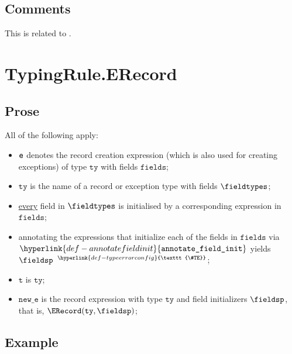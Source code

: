 \documentclass{book}
\newcommand\TypeErrorConfig[0]{\hyperlink{def-typeerrorconfig}{\texttt{\#TE}}}
\newcommand\ProseOrTypeError[0]{\hyperlink{def-proseortypeerror}{$^{\TypeErrorConfig}$}}
\newcommand\annotatefieldinit[0]{\hyperlink{def-annotatefieldinit}{\texttt{annotate\_field\_init}}}
\newcommand\vt[0]{\texttt{t}}
\newcommand\tty[0]{\texttt{ty}}
\newcommand\fields[0]{\texttt{fields}}
\newcommand\newe[0]{\texttt{new\_e}}
\begin{document}
\subsection{Comments}
  This is related to .

\section{TypingRule.ERecord \label{sec:TypingRule.ERecord}}

\subsection{Prose}
All of the following apply:
\begin{itemize}
  \item $\texttt{e}$ denotes the record creation expression (which is also used for creating exceptions) of type $\tty$ with fields $\fields$;
  \item $\tty$ is the name of a record or exception type with fields $\fieldtypes$;
  \item \underline{every} field in $\fieldtypes$ is initialised by a corresponding expression in $\fields$;
  \item annotating the expressions that initialize each of the fields in $\fields$ via \\
        $\annotatefieldinit$ yields $\fieldsp$ \ProseOrTypeError;
  \item $\vt$ is $\tty$;
  \item $\newe$ is the record expression with type $\tty$ and field initializers $\fieldsp$, that is, $\ERecord(\tty, \fieldsp)$;
\end{itemize}

\subsection{Example}

\end{document}
